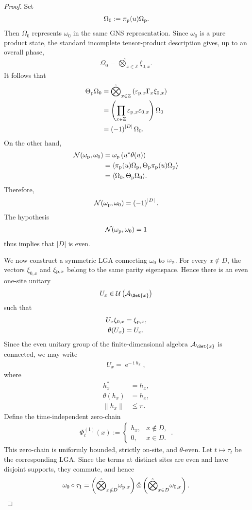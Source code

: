 \documentclass[a4paper,10pt]{article}
\numberwithin{equation}{section}
\theoremstyle{plain}
\theoremstyle{plain}
\theoremstyle{plain}
\theoremstyle{plain}
\theoremstyle{plain}
\theoremstyle{remark}
\theoremstyle{definition}
\newcommand{\ee}{\operatorname{e}}
\newcommand{\ii}{\operatorname{i}}
\newcommand{\ZZ}{\mathbb{Z}}
\newcommand{\calA}{\mathcal{A}}
\newcommand{\calN}{\mathcal{N}}
\newcommand{\calU}{\mathcal{U}}
\newcommand\norm[1]{\left\lVert#1\right\rVert}
\newcommand{\ip}[2]{\langle #1, #2 \rangle}
\newcommand{\ve}{\varepsilon}
\newcommand{\eq}[1]{\begin{align*}#1\end{align*}}
\newcommand{\eql}[1]{\begin{align}#1\end{align}}
\newcommand{\br}[1]{\left(#1\right)}
\begin{document}
\begin{proof}
Set
\eq{
\Omega_0
:=
\pi_{\rm p}(u)\Omega_{\rm p}.
}
Then $\Omega_0$ represents $\omega_0$ in the same GNS representation.
Since $\omega_0$ is a pure product state, the standard incomplete
tensor-product description gives, up to an overall phase,
\eq{
\Omega_0
=
\hat{\bigotimes}_{x\in\ZZ}
\xi_{0,x}.
}
It follows that
\eq{
\Theta_{\rm p}\Omega_0
&=
\hat{\bigotimes}_{x\in\ZZ}
\br{
\ve_{{\rm p},x}\Gamma_x\xi_{0,x}
}\\
&=
\br{
\prod_{x\in\ZZ}
\ve_{{\rm p},x}\ve_{0,x}
}
\Omega_0\\
&=
\br{
-1
}^{\lvert D\rvert}
\Omega_0.
}
On the other hand,
\eq{
\calN(\omega_{\rm p},\omega_0)
&=
\omega_{\rm p}
\br{
u^\ast\theta(u)
}\\
&=
\ip{
\pi_{\rm p}(u)\Omega_{\rm p}
}{
\Theta_{\rm p}\pi_{\rm p}(u)\Omega_{\rm p}
}\\
&=
\ip{
\Omega_0
}{
\Theta_{\rm p}\Omega_0
}.
}
Therefore,
\eql{
\calN(\omega_{\rm p},\omega_0)
=
\br{
-1
}^{\lvert D\rvert}.
}
The hypothesis
\eq{
\calN(\omega_{\rm p},\omega_0)
=
1
}
thus implies that $\lvert D\rvert$ is even.

We now construct a symmetric LGA connecting $\omega_0$ to
$\omega_{\rm p}$. For every $x\notin D$, the vectors $\xi_{0,x}$ and
$\xi_{{\rm p},x}$ belong to the same parity eigenspace. Hence there is
an even one-site unitary
\eq{
U_x
\in
\calU\br{
\calA_{\Set{x}}
}
}
such that
\eq{
U_x\xi_{0,x}
&=
\xi_{{\rm p},x},\\
\theta(U_x)
&=
U_x.
}
Since the even unitary group of the finite-dimensional algebra
$\calA_{\Set{x}}$ is connected, we may write
\eq{
U_x
=
\ee^{-\ii h_x},
}
where
\eq{
h_x^\ast
&=
h_x,\\
\theta(h_x)
&=
h_x,\\
\norm{h_x}
&\leq
\pi.
}
Define the time-independent zero-chain
\eq{
\Phi^{(1)}_t(x)
:=
\begin{cases}
h_x,
&
x\notin D,\\
0,
&
x\in D.
\end{cases}\,.
}
This zero-chain is uniformly bounded, strictly on-site, and
$\theta$-even. Let $t\mapsto\tau_t$ be the corresponding LGA. Since the
terms at distinct sites are even and have disjoint supports, they
commute, and hence
\eq{
\omega_0\circ\tau_1
=
\br{
\hat{\bigotimes}_{x\notin D}
\omega_{{\rm p},x}
}
\hat{\otimes}
\br{
\hat{\bigotimes}_{x\in D}
\omega_{0,x}
}.
}


\end{proof}
\end{document}
